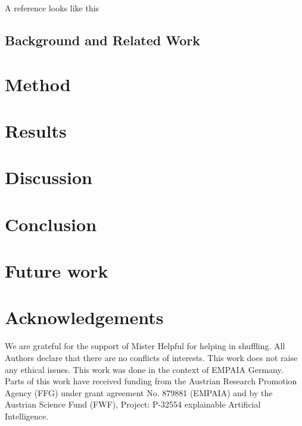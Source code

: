 \documentclass[a4paper,5p,review]{elsarticle}
\begin{document}
A reference looks like this \cite{HolzingerEtAl:2021:GraphFusion}

\subsection{Background and Related Work}
\label{sec:RelatedWork}

\section{Method}
\label{sec:Method}

\section{Results}
\label{sec:Results}

\section{Discussion}
\label{sec:Discussion}

\section{Conclusion}
\label{sec:Conclusion}

\section{Future work}
\label{sec:FutureWork}

\section*{Acknowledgements}
We are grateful for the support of Mister Helpful for helping in shuffling. All Authors declare that there are no conflicts of interests. This work does not raise any ethical issues. This work was done in the context of EMPAIA Germany. Parts of this work have received funding from the Austrian Research Promotion Agency (FFG) under grant agreement No. 879881 (EMPAIA) and by the Austrian Science Fund (FWF), Project: P-32554 explainable Artificial Intelligence. 




\end{document}
